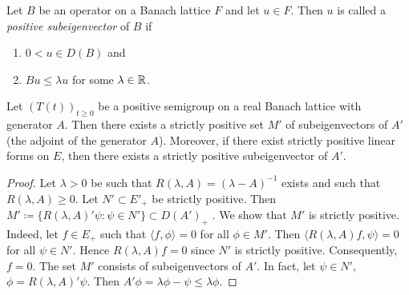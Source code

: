 \begin{definition}\label{def:c2-3.4}
Let $B$ be an operator on a Banach lattice $F$ and let $u \in F$.
Then $u$ is called a \emph{positive subeigenvector} of $B$ if
\begin{enumerate}[\upshape (i)]
\item \label{def:c2-3.4-1}
$0 < u \in D(B)$ and
\item \label{def:c2-3.4-2}
$Bu \leq \lambda u$ for some $\lambda \in \mathbb{R}$.
\end{enumerate}
\end{definition}
\begin{proposition}\label{prop:c2-3.5}
Let $(T(t))_{t \geq 0}$ be a positive semigroup on a real Banach lattice with generator $A$.
Then there exists a strictly positive set $M'$ of subeigenvectors of $A'$ (the adjoint of the generator $A$).
Moreover, if there exist strictly positive linear forms on $E$, then there exists a strictly positive subeigenvector of $A'$.
\end{proposition}
\begin{proof}
Let $\lambda > 0$ be such that $R(\lambda,A) = (\lambda - A)^{-1}$ exists and such that $R(\lambda,A) \geq 0$.
Let $N' \subset E'_{+}$ be strictly positive.
Then $M' \coloneq \{R(\lambda,A)'\psi \colon \psi \in N'\} \subset D(A')_{+}$ .
We show that $M'$ is strictly positive.
Indeed, let $f \in E_{+}$ such that $\langle f,\phi \rangle = 0$ for all $\phi \in M'$.
Then $\langle R(\lambda,A)f,\psi \rangle = 0$ for all $\psi \in N'$.
Hence $R(\lambda,A)f = 0$ since $N'$ is strictly positive.
Consequently, $f = 0$.
The set $M'$ consists of
subeigenvectors of $A'$. In fact, let $\psi \in N'$, $\phi = R(\lambda,A)'\psi$. Then
$A'\phi = \lambda\phi - \psi \leq \lambda\phi$.
\end{proof}

